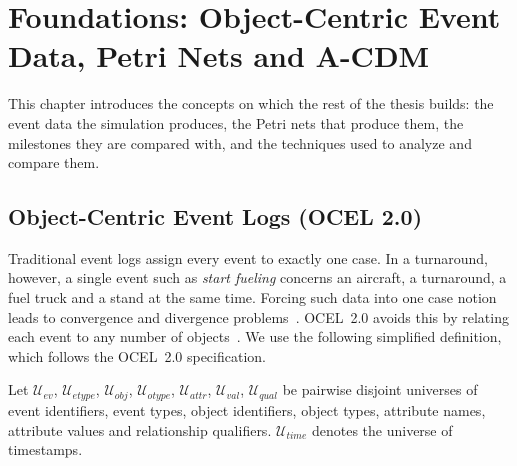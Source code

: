 \chapter{Foundations: Object-Centric Event Data, Petri Nets and A-CDM}
\label{ch:prelim}

This chapter introduces the concepts on which the rest of the thesis builds: the event data the simulation produces, the Petri nets that produce them, the milestones they are compared with, and the techniques used to analyze and compare them.

\section{Object-Centric Event Logs (OCEL 2.0)}
\label{sec:prelim-ocel}

Traditional event logs assign every event to exactly one case. In a turnaround, however, a single event such as \emph{start fueling} concerns an aircraft, a turnaround, a fuel truck and a stand at the same time. Forcing such data into one case notion leads to convergence and divergence problems~\cite{berti2023ocpmreview}. OCEL~2.0 avoids this by relating each event to any number of objects~\cite{koren2024ocel2}. We use the following simplified definition, which follows the OCEL~2.0 specification.

\begin{definition}[Universes]
Let $\mathcal{U}_{ev}$, $\mathcal{U}_{etype}$, $\mathcal{U}_{obj}$, $\mathcal{U}_{otype}$, $\mathcal{U}_{attr}$, $\mathcal{U}_{val}$, $\mathcal{U}_{qual}$ be pairwise disjoint universes of event identifiers, event types, object identifiers, object types, attribute names, attribute values and relationship qualifiers. $\mathcal{U}_{time}$ denotes the universe of timestamps.
\end{definition}

